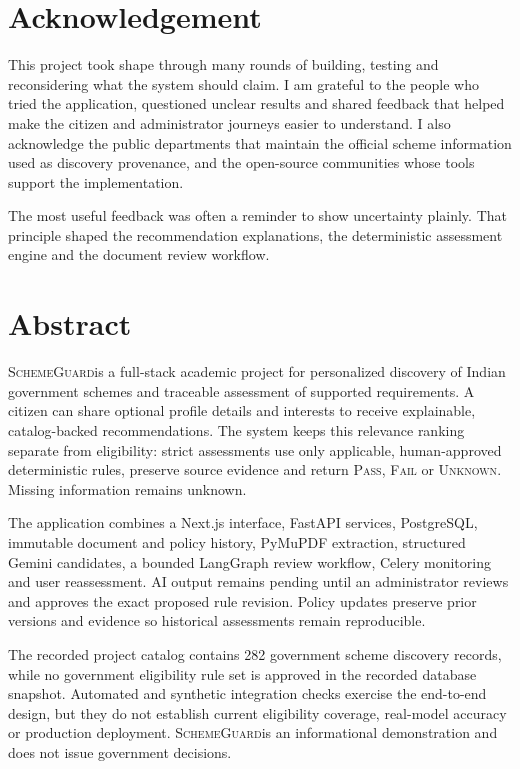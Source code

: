 \documentclass[12pt,a4paper,twoside]{report}
\newcommand{\SchemeGuard}{\textsc{SchemeGuard}}
\begin{document}
\chapter*{Acknowledgement}
This project took shape through many rounds of building, testing and reconsidering what the system should claim. I am grateful to the people who tried the application, questioned unclear results and shared feedback that helped make the citizen and administrator journeys easier to understand. I also acknowledge the public departments that maintain the official scheme information used as discovery provenance, and the open-source communities whose tools support the implementation.

The most useful feedback was often a reminder to show uncertainty plainly. That principle shaped the recommendation explanations, the deterministic assessment engine and the document review workflow.

\chapter*{Abstract}
\SchemeGuard is a full-stack academic project for personalized discovery of Indian government schemes and traceable assessment of supported requirements. A citizen can share optional profile details and interests to receive explainable, catalog-backed recommendations. The system keeps this relevance ranking separate from eligibility: strict assessments use only applicable, human-approved deterministic rules, preserve source evidence and return \textsc{Pass}, \textsc{Fail} or \textsc{Unknown}. Missing information remains unknown.

The application combines a Next.js interface, FastAPI services, PostgreSQL, immutable document and policy history, PyMuPDF extraction, structured Gemini candidates, a bounded LangGraph review workflow, Celery monitoring and user reassessment. AI output remains pending until an administrator reviews and approves the exact proposed rule revision. Policy updates preserve prior versions and evidence so historical assessments remain reproducible.

The recorded project catalog contains 282 government scheme discovery records, while no government eligibility rule set is approved in the recorded database snapshot. Automated and synthetic integration checks exercise the end-to-end design, but they do not establish current eligibility coverage, real-model accuracy or production deployment. \SchemeGuard is an informational demonstration and does not issue government decisions.
\end{document}
